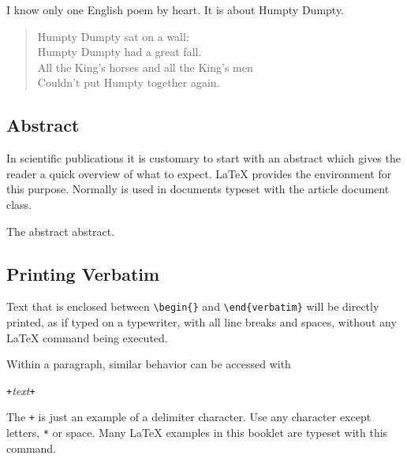 \begin{example}
I know only one English poem by 
heart. It is about Humpty Dumpty.
\begin{flushleft}
\begin{verse}
Humpty Dumpty sat on a wall:\\
Humpty Dumpty had a great fall.\\ 
All the King's horses and all
the King's men\\
Couldn't put Humpty together
again.
\end{verse}
\end{flushleft}
\end{example}

\subsection{Abstract}

In scientific publications it is customary to start with an abstract which
gives the reader a quick overview of what to expect. \LaTeX{} provides the
 environment for this purpose. Normally  is used
in documents typeset with the article document class.

\newenvironment{abstract}%
        {\begin{center}\begin{small}\begin{minipage}{0.8\textwidth}}%
        {\end{minipage}\end{small}\end{center}}
\begin{example}
\begin{abstract}
The abstract abstract.
\end{abstract}
\end{example}

\subsection{Printing Verbatim}

Text that is enclosed between \verb|\begin{|\verb|}| and
\verb|\end{verbatim}| will be directly printed, as if typed on a
typewriter, with all line breaks and spaces, without any \LaTeX{}
command being executed.

Within a paragraph, similar behavior can be accessed with
\begin{lscommand}
\verb|+|\emph{text}\verb|+|
\end{lscommand}
\noindent The \verb|+| is just an example of a delimiter character. Use any
character except letters, \verb|*| or space. Many \LaTeX{} examples in this
booklet are typeset with this command.

